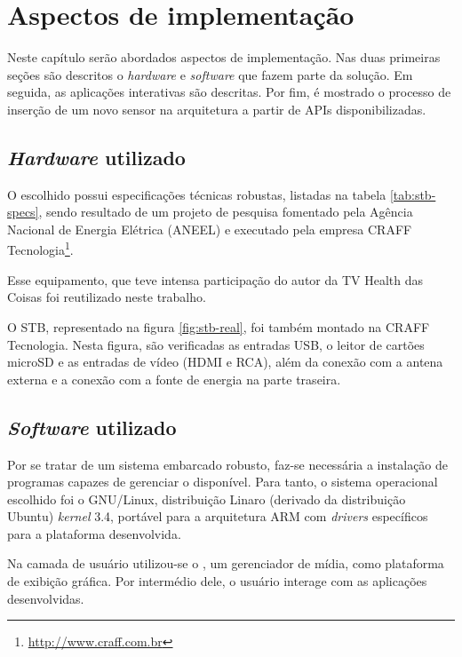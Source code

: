 \chapter{Aspectos de implementação} \label{cap:aspectos-de-implementacao}

Neste capítulo serão abordados aspectos de implementação. Nas duas primeiras
seções são descritos o \textit{hardware} e \textit{software} que fazem parte da
solução. Em seguida, as aplicações interativas são descritas. Por fim, é mostrado
o processo de inserção de um novo sensor na arquitetura a partir de APIs 
disponibilizadas.

\section{\textit{Hardware} utilizado} 

O \stb[] escolhido possui especificações técnicas robustas, listadas na 
tabela \ref{tab:stb-specs}, sendo resultado de um projeto de pesquisa
fomentado pela Agência Nacional de Energia Elétrica (ANEEL) e executado pela
empresa CRAFF Tecnologia\footnote{\url{http://www.craff.com.br}}. 

Esse equipamento, que teve intensa participação do autor da TV Health das
Coisas foi reutilizado neste trabalho.


O STB, representado na figura \vref{fig:stb-real}, foi também montado na CRAFF
Tecnologia. Nesta figura, são verificadas as entradas USB, o leitor de cartões
microSD e as entradas de vídeo (HDMI e RCA), além da conexão com a antena
externa e a conexão com a fonte de energia na parte traseira.

\section{\textit{Software} utilizado}

Por se tratar de um sistema embarcado robusto, faz-se necessária a instalação
de programas capazes de gerenciar o \hardware[] disponível. Para tanto, o
sistema operacional escolhido foi o GNU/Linux, distribuição Linaro (derivado da
distribuição Ubuntu) \textit{kernel} 3.4, portável para a arquitetura ARM com
\textit{drivers} específicos para a plataforma desenvolvida.


Na camada de usuário utilizou-se o \software[] \xbmc[], um gerenciador de mídia,
como plataforma de exibição gráfica. Por intermédio dele, o usuário
interage com as aplicações desenvolvidas.  

